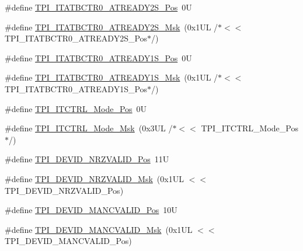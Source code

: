 \begin{DoxyCompactItemize}
\item 
\#define \mbox{\hyperlink{group___c_m_s_i_s___t_p_i_ga0ca42c4782e0a5421c34b14a0183c220}{T\+P\+I\+\_\+\+I\+T\+A\+T\+B\+C\+T\+R0\+\_\+\+A\+T\+R\+E\+A\+D\+Y2\+S\+\_\+\+Pos}}~0U
\item 
\#define \mbox{\hyperlink{group___c_m_s_i_s___t_p_i_ga07713088c6abb2ab14efa3a0e0b9e454}{T\+P\+I\+\_\+\+I\+T\+A\+T\+B\+C\+T\+R0\+\_\+\+A\+T\+R\+E\+A\+D\+Y2\+S\+\_\+\+Msk}}~(0x1\+U\+L /$\ast$$<$$<$ T\+P\+I\+\_\+\+I\+T\+A\+T\+B\+C\+T\+R0\+\_\+\+A\+T\+R\+E\+A\+D\+Y2\+S\+\_\+\+Pos$\ast$/)
\item 
\#define \mbox{\hyperlink{group___c_m_s_i_s___t_p_i_ga616d6fbe0522ce0c5ad1711d33509907}{T\+P\+I\+\_\+\+I\+T\+A\+T\+B\+C\+T\+R0\+\_\+\+A\+T\+R\+E\+A\+D\+Y1\+S\+\_\+\+Pos}}~0U
\item 
\#define \mbox{\hyperlink{group___c_m_s_i_s___t_p_i_ga6211d550c37ce45f9593ddf98d71f6eb}{T\+P\+I\+\_\+\+I\+T\+A\+T\+B\+C\+T\+R0\+\_\+\+A\+T\+R\+E\+A\+D\+Y1\+S\+\_\+\+Msk}}~(0x1\+U\+L /$\ast$$<$$<$ T\+P\+I\+\_\+\+I\+T\+A\+T\+B\+C\+T\+R0\+\_\+\+A\+T\+R\+E\+A\+D\+Y1\+S\+\_\+\+Pos$\ast$/)
\item 
\#define \mbox{\hyperlink{group___c_m_s_i_s___t_p_i_gaa847adb71a1bc811d2e3190528f495f0}{T\+P\+I\+\_\+\+I\+T\+C\+T\+R\+L\+\_\+\+Mode\+\_\+\+Pos}}~0U
\item 
\#define \mbox{\hyperlink{group___c_m_s_i_s___t_p_i_gad6f87550b468ad0920d5f405bfd3f017}{T\+P\+I\+\_\+\+I\+T\+C\+T\+R\+L\+\_\+\+Mode\+\_\+\+Msk}}~(0x3\+U\+L /$\ast$$<$$<$ T\+P\+I\+\_\+\+I\+T\+C\+T\+R\+L\+\_\+\+Mode\+\_\+\+Pos$\ast$/)
\item 
\#define \mbox{\hyperlink{group___c_m_s_i_s___t_p_i_ga9f46cf1a1708575f56d6b827766277f4}{T\+P\+I\+\_\+\+D\+E\+V\+I\+D\+\_\+\+N\+R\+Z\+V\+A\+L\+I\+D\+\_\+\+Pos}}~11U
\item 
\#define \mbox{\hyperlink{group___c_m_s_i_s___t_p_i_gacecc8710a8f6a23a7d1d4f5674daf02a}{T\+P\+I\+\_\+\+D\+E\+V\+I\+D\+\_\+\+N\+R\+Z\+V\+A\+L\+I\+D\+\_\+\+Msk}}~(0x1\+U\+L $<$$<$ T\+P\+I\+\_\+\+D\+E\+V\+I\+D\+\_\+\+N\+R\+Z\+V\+A\+L\+I\+D\+\_\+\+Pos)
\item 
\#define \mbox{\hyperlink{group___c_m_s_i_s___t_p_i_ga675534579d9e25477bb38970e3ef973c}{T\+P\+I\+\_\+\+D\+E\+V\+I\+D\+\_\+\+M\+A\+N\+C\+V\+A\+L\+I\+D\+\_\+\+Pos}}~10U
\item 
\#define \mbox{\hyperlink{group___c_m_s_i_s___t_p_i_ga4c3ee4b1a34ad1960a6b2d6e7e0ff942}{T\+P\+I\+\_\+\+D\+E\+V\+I\+D\+\_\+\+M\+A\+N\+C\+V\+A\+L\+I\+D\+\_\+\+Msk}}~(0x1\+U\+L $<$$<$ T\+P\+I\+\_\+\+D\+E\+V\+I\+D\+\_\+\+M\+A\+N\+C\+V\+A\+L\+I\+D\+\_\+\+Pos)

\end{DoxyCompactItemize}
